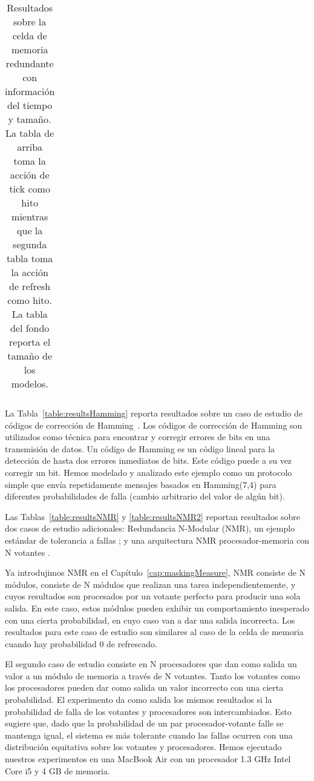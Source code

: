 \begin{table}
{\begin{tabular}{c!{}c!{}|>{\ \,}c!{\ }c!{\ }|!{\ }c!{\ }c!{\ }|!{\ }c!{\ }c}
    \end{tabular}
    }
  \vspace{1.5ex}
  \caption{Resultados sobre la celda de memoria redundante con información del tiempo y tamaño. La tabla de arriba toma la acción de tick como hito mientras que la segunda tabla toma la acción de refresh como hito. La tabla del fondo reporta el tamaño de los modelos.}
  \label{table:resultsMEM}
\end{table}


La Tabla~\ref{table:resultsHamming} reporta resultados sobre un caso de estudio de códigos de corrección de Hamming~\cite{LinCostello2004}. Los códigos de corrección de Hamming son utilizados como técnica para encontrar y corregir errores de bits en una transmisión de datos. 
Un código de Hamming es un código lineal para la detección de hasta dos errores inmediatos de bits. Este código puede a su vez corregir un bit.
Hemos modelado y analizado este ejemplo como un protocolo simple que envía repetidamente mensajes basados en Hamming(7,4) para diferentes probabilidades de falla (cambio arbitrario del valor de algún bit).

Las Tablas~\ref{table:resultsNMR} y \ref{table:resultsNMR2} reportan resultados sobre dos casos de estudio adicionales: Redundancia N-Modular (NMR), un ejemplo estándar de tolerancia a fallas \cite{ShoomanBook}; y una arquitectura NMR procesador-memoria con N votantes \cite{KrishnaBook}.

Ya introdujimos NMR en el Capítulo~\ref{cap:maskingMeasure}, NMR consiste de N módulos, consiste de N módulos que realizan una tarea independientemente, y cuyos resultados son procesados por un votante perfecto para producir una sola salida.
En este caso, estos módulos pueden exhibir un comportamiento inesperado con una cierta probabilidad, en cuyo caso van a dar una salida incorrecta. Los resultados para este caso de estudio son similares al caso de la celda de memoria cuando hay probabilidad $0$ de refrescado. 

El segundo caso de estudio consiste en N procesadores que dan como salida un valor a un módulo de memoria a través de N votantes. Tanto los votantes como los procesadores pueden dar como salida un valor incorrecto con una cierta probabilidad.
El experimento da como salida los mismos resultados si la probabilidad de falla de los votantes y procesadores son intercambiados. Esto sugiere que, dado que la probabilidad de un par procesador-votante falle se mantenga igual, el sistema es más tolerante cuando las fallas ocurren con una distribución equitativa sobre los votantes y procesadores.
Hemos ejecutado nuestros experimentos en una MacBook Air con un procesador 1.3 GHz Intel Core i5 y 
4 GB de memoria.


